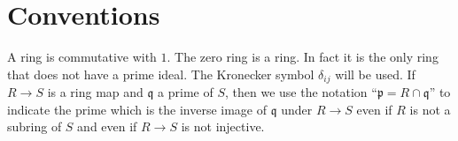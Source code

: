 \section{Conventions}
\label{section-conventions}

\noindent
A ring is commutative with $1$. The zero ring is a ring. In fact it is
the only ring that does not have a prime ideal. The Kronecker
symbol $\delta_{ij}$ will be used. If $R \to S$ is a ring map and
$\mathfrak q$ a prime of $S$, then we use the notation
``$\mathfrak p = R \cap \mathfrak q$''
to indicate the prime which is the inverse image of $\mathfrak q$ under
$R \to S$ even if $R$ is not a subring of $S$ and even if $R \to S$
is not injective.






